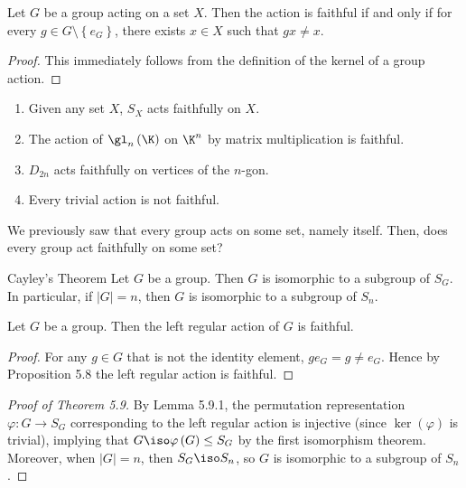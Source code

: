 \documentclass[pmath347]{subfiles}
\begin{document}
    \begin{prop}{}
        Let $G$ be a group acting on a set $X$. Then the action is faithful if and only if for every $g\in G\setminus \left\lbrace e_G \right\rbrace$, there exists $x\in X$ such that $gx\neq x$.
    \end{prop}

    \begin{proof}
        This immediately follows from the definition of the kernel of a group action.
    \end{proof}

    \ex
    \begin{enumerate}
        \item Given any set $X$, $S_X$ acts faithfully on $X$.
        \item The action of $\gl_n\left( \K \right) $ on $\K^n$ by matrix multiplication is faithful.
        \item $D_{2n}$ acts faithfully on vertices of the $n$-gon.
        \item Every trivial action is not faithful.
    \end{enumerate}
    We previously saw that every group acts on some set, namely itself. Then, does every group act faithfully on some set?

    \begin{theorem}{Cayley's Theorem}
        Let $G$ be a group. Then $G$ is isomorphic to a subgroup of $S_G$. In particular, if $\left| G \right| = n$, then $G$ is isomorphic to a subgroup of $S_n$.
    \end{theorem}	

    \clearpage
    \begin{lemma_inside}{}
        Let $G$ be a group. Then the left regular action of $G$ is faithful.
    \end{lemma_inside}

    \begin{proof}
        For any $g\in G$ that is not the identity element, $ge_G = g \neq e_G$. Hence by Proposition 5.8 the left regular action is faithful.
    \end{proof}

    \begin{proof}[Proof of Theorem 5.9]
        By Lemma 5.9.1, the permutation representation $\varphi:G\to S_G$ corresponding to the left regular action is injective (since $\ker\left( \varphi \right)$ is trivial), implying that $G\iso\varphi\left( G \right) \leq S_G$ by the first isomorphism theorem. Moreover, when $\left| G \right| = n$, then $S_G\iso S_n$, so $G$ is isomorphic to a subgroup of $S_n$.
    \end{proof}
\end{document}
